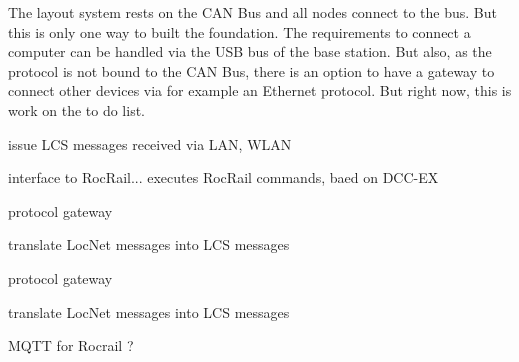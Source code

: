
The layout system rests on the CAN Bus and all nodes connect to the bus. But this is only one way to built the foundation. The requirements to connect a computer can be handled via the USB bus of the base station. But also, as the protocol is not bound to the CAN Bus, there is an option to have a gateway to connect other devices via for example an Ethernet protocol. But right now, this is work on the to do list.



issue LCS messages received via LAN, WLAN



interface to RocRail... executes RocRail commands, baed on DCC-EX


protocol gateway

translate LocNet messages into LCS messages


protocol gateway

translate LocNet messages into LCS messages



MQTT for Rocrail ?


